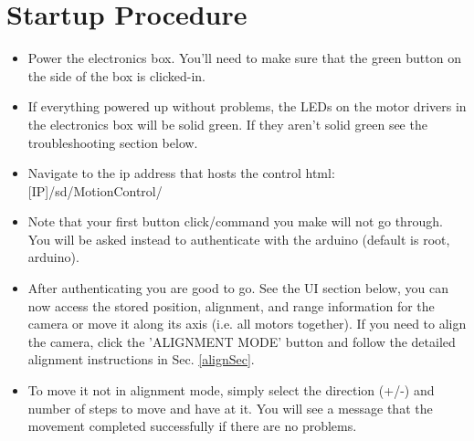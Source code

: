 \documentclass[11pt]{article}
\begin{document}
\section{Startup Procedure}

\begin{itemize}
	\item Power the electronics box.  You'll need to make sure that the green button on the side of the box is clicked-in.
	\item If everything powered up without problems, the LEDs on the motor drivers in the electronics box will be solid green. 
		If they aren't solid green see the troubleshooting section below.
	\item Navigate to the ip address that hosts the control html: [IP]/sd/MotionControl/
	\item Note that your first button click/command you make will not go through.  
		You will be asked instead to authenticate with the arduino (default is root, arduino).
	\item After authenticating you are good to go.  
		See the UI section below, you can now access the stored position, alignment, and range information for the camera or move it along its axis (i.e. all motors together).  
		If you need to align the camera, click the 'ALIGNMENT MODE' button and follow the detailed alignment instructions in Sec. \ref{alignSec}.
	\item To move it not in alignment mode, simply select the direction (+/-) and number of steps to move and have at it.  
		You will see a message that the movement completed successfully if there are no problems.
\end{itemize}
\end{document}
